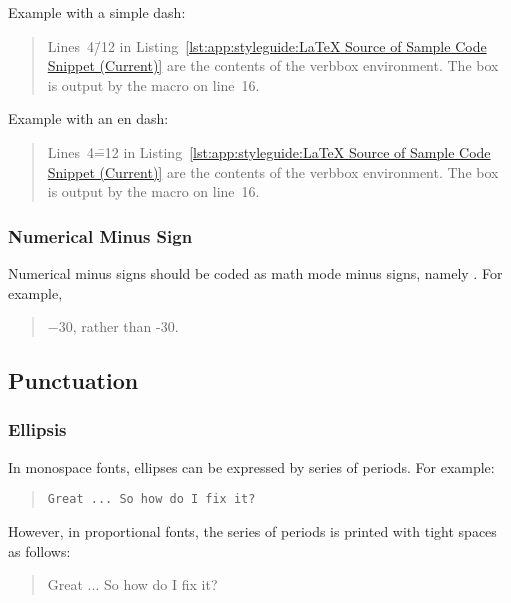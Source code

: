 Example with a simple dash:

\begin{quote}
  Lines~4\=/12 in
  Listing~\ref{lst:app:styleguide:LaTeX Source of Sample Code Snippet (Current)}
  are the contents of the verbbox environment. The box is output
  by the \co{\\theverbbox} macro on line~16.
\end{quote}

Example with an en dash:

\begin{quote}
  Lines~4\==12 in
  Listing~\ref{lst:app:styleguide:LaTeX Source of Sample Code Snippet (Current)}
  are the contents of the verbbox environment. The box is output
  by the \co{\\theverbbox} macro on line~16.
\end{quote}

\subsubsection{Numerical Minus Sign}
\label{sec:app:styleguide:Numerical Minus Sign}

Numerical minus signs should be coded as math mode minus signs,
namely \qco{$-$}. For example,

\begin{quote}
  $-30$, rather than -30.
\end{quote}

\subsection{Punctuation}
\label{sec:app:styleguide:Punctuation}

\subsubsection{Ellipsis}
\label{sec:app:styleguide:Ellipsis}

In monospace fonts, ellipses can be expressed by
series of periods. For example:

\begin{quote}
  \verb|Great ... So how do I fix it?|
\end{quote}

However, in proportional fonts, the series of periods is printed
with tight spaces as follows:

\begin{quote}
  Great ... So how do I fix it?
\end{quote}

